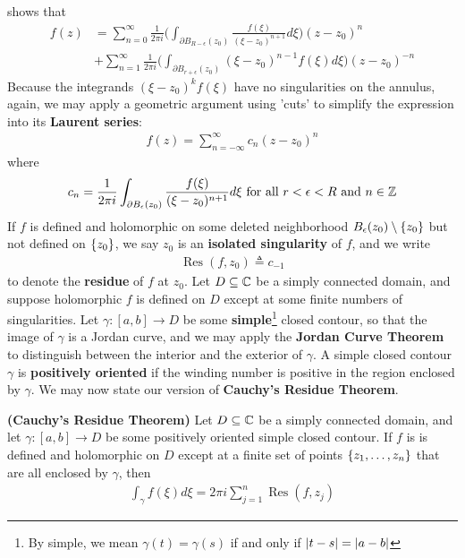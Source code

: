\documentclass{report}
\begin{document}
shows that 
\begin{align*}
f(z)&= \sum_{n=0}^{\infty} \frac{1}{2\pi  i}\Big( \int_{\partial  B_{R- \epsilon }(z_0)} \frac{f(\xi)}{(\xi - z_0)^{n+1}}d\xi \Big) (z-z_0)^n \\
&+ \sum_{n=1}^{\infty} \frac{1}{2\pi i}\Big( \int_{\partial B_{r+\epsilon }(z_0)} (\xi- z_0)^{n-1}f(\xi)d \xi \Big)(z-z_0)^{-n}
\end{align*}
Because the integrands $(\xi -z_0)^kf(\xi)$ have no singularities on the annulus, again, we may apply a geometric argument using 'cuts' to simplify the expression into its \textbf{Laurent series}:
\begin{align*}
  f(z)= \sum_{n=-\infty}^{\infty}c_n (z-z_0)^n
\end{align*}
where
\begin{align}
\label{cnp}
c_n= \frac{1}{2\pi i} \int_{\partial B_\epsilon (z_0)} \frac{f(\xi)}{(\xi - z_0)^{n+1}}d\xi \text{ for all } r<\epsilon  <R \text{ and }n\in\mathbb{Z}
\end{align}
If $f$ is defined and holomorphic on some deleted neighborhood $B_\epsilon (z_0)\setminus \{ z_0 \}$ but not defined on $\{ z_0 \}$, we say $z_0$ is an  \textbf{isolated singularity} of $f$, and we write 
\begin{align*}
\operatorname{Res}(f,z_0)\triangleq c_{-1}
\end{align*}
to denote the \textbf{residue} of $f$ at $z_0$. Let $D\subseteq \mathbb{C}$ be a simply connected domain, and suppose holomorphic $f$ is defined on $D$ except at some finite numbers of singularities. Let $\gamma :[a,b]\rightarrow D$ be some \textbf{simple}\footnote{By simple, we mean  $\gamma (t)=\gamma (s)$ if and only if $\left|t-s\right|=\left|a-b\right|$} closed contour, so that the image of $\gamma $ is a Jordan curve, and we may apply the \textbf{Jordan Curve Theorem} to distinguish between the interior and the exterior of $\gamma $. A simple closed contour $\gamma $ is \textbf{positively oriented} if the winding number is positive in the region enclosed by $\gamma $. We may now state our version of \textbf{Cauchy's Residue Theorem}. 
\begin{theorem}
\textbf{(Cauchy's Residue Theorem)}  Let $D\subseteq \mathbb{C}$ be a simply connected domain, and let $\gamma :[a,b]\rightarrow D$ be some positively oriented simple closed contour. If $f$ is is defined and holomorphic on  $D$ except at a finite set of points $\{ z_1,\dots ,z_n \}$ that are all enclosed by $\gamma $, then 
\begin{align*}
\int_\gamma f(\xi)d\xi = 2\pi  i\sum_{j=1}^n \operatorname{Res}(f,z_j) 
\end{align*}
\end{theorem}
\end{document}
